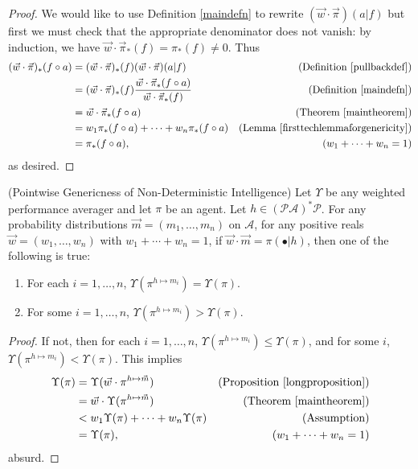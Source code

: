 \documentclass[runningheads]{llncs}
\begin{document}
\begin{proof}
    We would like to use Definition \ref{maindefn} to rewrite
    $(\vec w\cdot\vec\pi)(a|f)$ but first we must
    check that the appropriate denominator does not vanish:
    by induction, we have
    $\vec w\cdot\vec\pi_*(f)=\pi_*(f)\not=0$.
    Thus
    \begin{align*}
        (\vec w\cdot\vec\pi)_*(f\circ a)
            &= (\vec w\cdot\vec\pi)_*(f)
                (\vec w\cdot\vec\pi)(a|f)
                    &\mbox{(Definition \ref{pullbackdef})}\\
            &= (\vec w\cdot\vec\pi)_*(f)\frac{\vec w\cdot\vec\pi_*(f\circ a)}
                {\vec w\cdot\vec\pi_*(f)}
                    &\mbox{(Definition \ref{maindefn})}\\
            &= \vec w\cdot\vec\pi_*(f\circ a)
                    &\mbox{(Theorem \ref{maintheorem})}\\
            &= w_1\pi_*(f\circ a)+\cdots+w_n\pi_*(f\circ a)
                    &\mbox{(Lemma \ref{firsttechlemmaforgenericity})}\\
            &= \pi_*(f\circ a),
                    &\mbox{($w_1+\cdots+w_n=1$)}
    \end{align*}
    as desired.
\end{proof}

\begin{theorem}
\label{pointwisegenericnessthm}
    (Pointwise Genericness of Non-Deterministic Intelligence)
    Let $\Upsilon$ be any weighted performance averager and let
    $\pi$ be an agent.
    Let $h\in (\mathcal P\mathcal A)^*\mathcal P$.
    For any probability distributions $\vec m=(m_1,\ldots,m_n)$ on $\mathcal A$,
    for any positive reals $\vec w=(w_1,\ldots,w_n)$ with $w_1+\cdots+w_n=1$,
    if $\vec w\cdot\vec m=\pi(\bullet|h)$,
    then one of the following is true:
    \begin{enumerate}
        \item For each $i=1,\ldots,n$, $\Upsilon(\pi^{h\mapsto m_i})=\Upsilon(\pi)$.
        \item For some $i=1,\ldots,n$, $\Upsilon(\pi^{h\mapsto m_i})>\Upsilon(\pi)$.
    \end{enumerate}
\end{theorem}

\begin{proof}
    If not, then for each $i=1,\ldots,n$, $\Upsilon(\pi^{h\mapsto m_i})\leq\Upsilon(\pi)$,
    and for some $i$, $\Upsilon(\pi^{h\mapsto m_i})<\Upsilon(\pi)$.
    This implies
    \begin{align*}
        \Upsilon(\pi)
            &= \Upsilon(\vec w\cdot\pi^{h\mapsto\vec m})
                &\mbox{(Proposition \ref{longproposition})}\\
            &= \vec w\cdot\Upsilon(\pi^{h\mapsto\vec m})
                &\mbox{(Theorem \ref{maintheorem})}\\
            &< w_1\Upsilon(\pi)+\cdots+w_n\Upsilon(\pi)
                &\mbox{(Assumption)}\\
            &= \Upsilon(\pi),
                &\mbox{($w_1+\cdots+w_n=1$)}
    \end{align*}
    absurd.
\end{proof}
\end{document}
